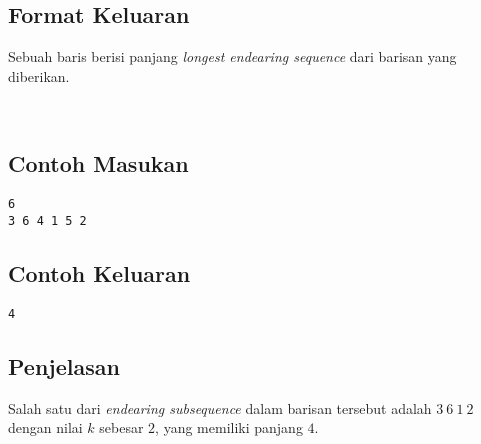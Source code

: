 \documentclass{article}
\begin{document}
\subsection*{Format Keluaran}
Sebuah baris berisi panjang \textit{longest endearing sequence} dari barisan yang diberikan.

\\

\begin{multicols}{2}
\subsection*{Contoh Masukan}
\begin{lstlisting}
6
3 6 4 1 5 2
\end{lstlisting}
\columnbreak
\subsection*{Contoh Keluaran}
\begin{lstlisting}
4
\end{lstlisting}
\vfill
\null
\end{multicols}

\subsection*{Penjelasan}
Salah satu dari \textit{endearing subsequence} dalam barisan tersebut adalah $3\:6\:1\:2$ dengan nilai $k$ sebesar $2$, yang memiliki panjang $4$.

\pagebreak
\end{document}
